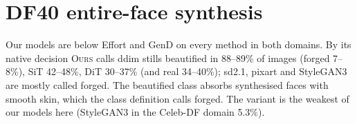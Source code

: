 \documentclass[10pt]{article}
\newcommand{\ours}{\textsc{Ours}}
\begin{document}
\section{DF40 entire-face synthesis}
\label{sec:efs}
\begin{table}[H]
\centering
\caption{DF40 entire-face synthesis, 300 images per method and domain (rng 0): share above the 95th percentile of same-domain DF40
real frames, FF++ / Celeb-DF domain (\%). Last row: share that \ours{} sends to its beautified class by its native decision.
Descriptive probe, no bar. Generator stills against H.264 real frames is a confound.}
\label{tab:efs}
\scriptsize
\begin{adjustbox}{max width=\linewidth}\end{adjustbox}
\end{table}
Our models are below Effort and GenD on every method in both domains. By its native decision \ours{} calls ddim stills beautified
in 88--89\% of images (forged 7--8\%), SiT 42--48\%, DiT 30--37\% (and real 34--40\%); sd2.1, pixart and StyleGAN3 are mostly called
forged. The beautified class absorbs synthesised faces with smooth skin, which the class definition calls forged. The variant is the
weakest of our models here (StyleGAN3 in the Celeb-DF domain 5.3\%).
\end{document}
